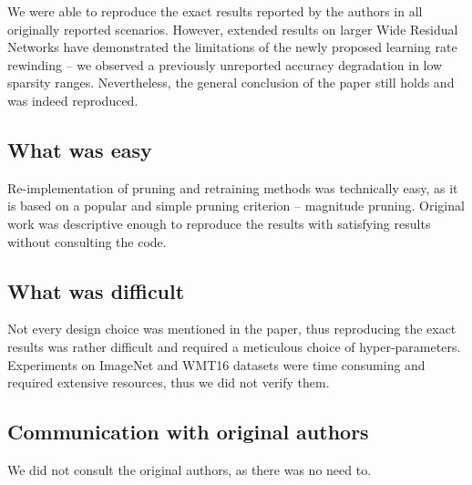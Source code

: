 We were able to reproduce the exact results reported by the authors in all originally reported scenarios. However, extended results on larger Wide Residual Networks have demonstrated the limitations of the newly proposed learning rate rewinding -- we observed a previously unreported accuracy degradation in low sparsity ranges. Nevertheless, the general conclusion of the paper still holds and was indeed reproduced.

\subsection*{What was easy}

Re-implementation of pruning and retraining methods was technically easy, as it is based on a popular and simple pruning criterion -- magnitude pruning. Original work was descriptive enough to reproduce the results with satisfying results without consulting the code.

\subsection*{What was difficult}

Not every design choice was mentioned in the paper, thus reproducing the exact results was rather difficult and required a meticulous choice of hyper-parameters. Experiments on ImageNet and WMT16 datasets were time consuming and required extensive resources, thus we did not verify them.


\subsection*{Communication with original authors}

We did not consult the original authors, as there was no need to.

\clearpage

\renewcommand{\arraystretch}{1.5}

